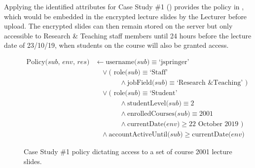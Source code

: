 Applying the identified attributes for Case Study \#1 () provides the \thePolicyLang policy in , which would be embedded in the encrypted lecture slides by the Lecturer before upload. The encrypted slides can then remain stored on the server but only accessible to Research \& Teaching staff members until 24 hours before the lecture date of 23/10/19, when students on the course will also be granted access.

\begin{figure}[ht]
  \centering
\begin{align*}
  \text{Policy($sub$, $env$, $res$)}
  &
    \leftarrow
    \text{username($sub$)} \equiv \text{`jspringer'}
  \\
  &
    \phantom{::}\vee
    \text{( role($sub$)} \equiv \text{`Staff'}
  \\
  &
    \phantom{::::::::}\wedge
    \text{jobField($sub$)} \equiv \text{`Research \& Teaching' )}
  \\
  &
    \phantom{::}\vee
    \text{( role($sub$)} \equiv \text{`Student'}
  \\
  &
    \phantom{::::::::}\wedge
    \text{studentLevel($sub$)} \equiv \text{2}
  \\
  &
    \phantom{::::::::}\wedge
    \text{enrolledCourses($sub$)} \equiv \text{2001}
  \\
  &
    \phantom{::::::::}\wedge
    \text{currentDate($env$)} \geq \text{22 October 2019 )}
  \\
  &
    \phantom{::}\wedge
    \text{accountActiveUntil($sub$)} \geq \text{currentDate($env$)}
\end{align*}
  \caption{
    \label{fig:case_study_policy_1}
    Case Study \#1 policy dictating access to a set of course 2001 lecture slides.
  }
\end{figure}
